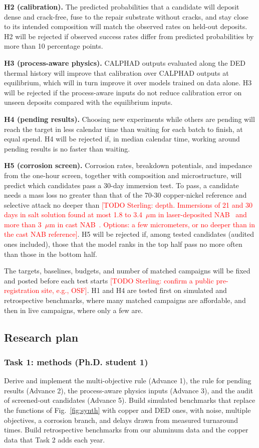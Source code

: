 \documentclass[12pt,letterpaper]{article}
\newcommand{\todo}[1]{\textcolor{red}{[TODO Sterling: #1]}}
\begin{document}
\textbf{H2 (calibration).} The predicted probabilities that a candidate will
deposit dense and crack-free, fuse to the repair substrate without cracks,
and stay close to its intended composition will match the observed rates on
held-out deposits. H2 will be rejected if observed success rates differ from
predicted probabilities by more than 10 percentage points.

\textbf{H3 (process-aware physics).} CALPHAD outputs evaluated along the DED
thermal history will improve that calibration over CALPHAD outputs at
equilibrium, which will in turn improve it over models trained on data
alone. H3 will be rejected if the process-aware inputs do not reduce
calibration error on unseen deposits compared with the equilibrium inputs.

\textbf{H4 (pending results).} Choosing new experiments while others are
pending will reach the target in less calendar time than waiting for each
batch to finish, at equal spend. H4 will be rejected if, in median calendar
time, working around pending results is no faster than waiting.

\textbf{H5 (corrosion screen).} Corrosion rates, breakdown potentials, and
impedance from the one-hour screen, together with composition and
microstructure, will predict which candidates pass a 30-day immersion test.
To pass, a candidate needs a mass loss no greater than that of the 70-30
copper-nickel reference and selective attack no deeper than \todo{depth. Immersions of 21 and 30 days in salt
solution found at most 1.8 to 3.4~$\mu$m in laser-deposited NAB~\cite{zhao2022}
and more than 3~$\mu$m in cast NAB~\cite{tan2024}. Options: a few micrometers, or
no deeper than in the cast NAB reference}. H5 will be
rejected if, among tested candidates (audited ones included), those that the
model ranks in the top half pass no more often than those in the bottom half.

The targets, baselines, budgets, and number of matched campaigns will be fixed and posted before each test starts \todo{confirm a public pre-registration site, e.g., OSF}.
H1 and H4 are tested first on simulated and retrospective benchmarks, where many matched campaigns are affordable, and then in live campaigns, where only a few are.

\subsection{Research plan}

\subsubsection{Task 1: methods (Ph.D. student 1)}
Derive and implement the multi-objective rule (Advance 1), the rule for
pending results (Advance 2), the process-aware physics inputs (Advance 3),
and the audit of screened-out candidates (Advance 5). Build simulated
benchmarks that replace the functions of Fig.~\ref{fig:synth} with copper and
DED ones, with noise, multiple objectives, a corrosion branch, and delays
drawn from measured turnaround times. Build retrospective benchmarks from our
aluminum data and the copper data that Task 2 adds each year.
\end{document}

